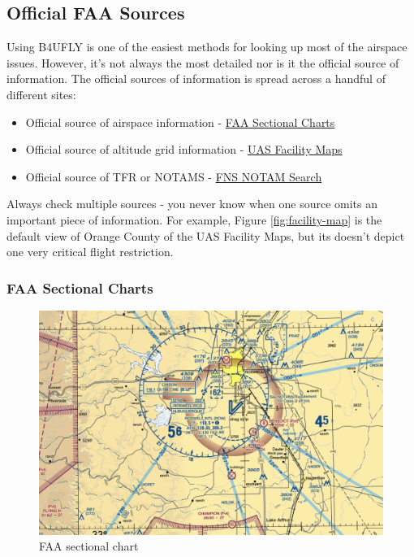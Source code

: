 \documentclass[
  12pt,
]{book}
\providecommand{\tightlist}{%
  \setlength{\itemsep}{0pt}\setlength{\parskip}{0pt}}
\newenvironment{notebox}{
  \definecolor{shadecolor}{gray}{.8}  %
  \color{black}
  \begin{shaded}}
 {\end{shaded}}
\begin{document}
\subsection{Official FAA Sources}\label{official-faa-sources}

Using B4UFLY is one of the easiest methods for looking up most of the airspace issues. However, it's not always the most detailed nor is it the official source of information. The official sources of information is spread across a handful of different sites:

\begin{itemize}
\tightlist
\item
  Official source of airspace information - \href{https://www.faa.gov/air_traffic/flight_info/aeronav/digital_products/vfr/}{FAA Sectional Charts}
\item
  Official source of altitude grid information - \href{https://faa.maps.arcgis.com/apps/webappviewer/index.html?id=9c2e4406710048e19806ebf6a06754ad}{UAS Facility Maps}
\item
  Official source of TFR or NOTAMS - \href{https://notams.aim.faa.gov/notamSearch/nsapp.html\#/}{FNS NOTAM Search}
\end{itemize}

\begin{notebox}
Always check multiple sources - you never know when one source omits an important piece of information. For example, Figure \ref{fig:facility-map} is the default view of Orange County of the UAS Facility Maps, but its doesn't depict one very critical flight restriction.

\end{notebox}

\subsubsection{FAA Sectional Charts}\label{faa-sectional-charts}

\begin{figure}
\centering
\includegraphics{images/FAA-VFR.png}
\caption{FAA sectional chart}
\end{figure}
\end{document}
